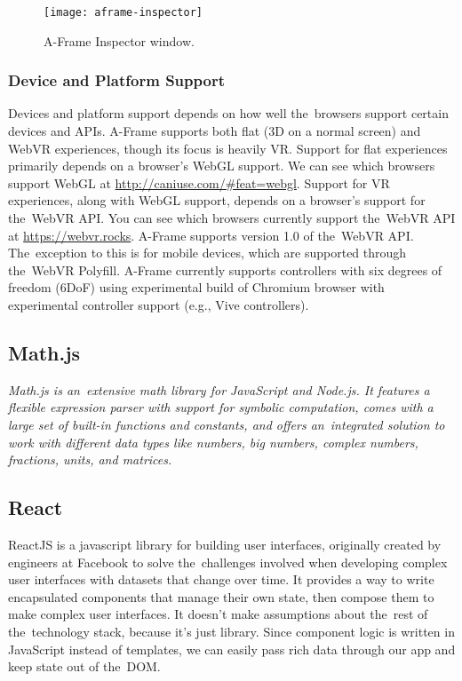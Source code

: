 \begin{figure}[ht!]
\centering
\texttt{[image: aframe-inspector]}
\caption{A-Frame Inspector window.}
\label{r:41}
\end{figure}

\subsubsection{Device and Platform Support}
Devices and platform support depends on how well the~browsers support certain devices and APIs. A-Frame supports both flat (3D on a normal screen) and WebVR experiences, though its focus is heavily VR. Support for flat experiences primarily depends on a browser’s WebGL support. We can see which browsers support WebGL at \url{http://caniuse.com/#feat=webgl}. Support for VR experiences, along with WebGL support, depends on a browser’s support for the~WebVR API. You can see which browsers currently support the~WebVR API at \url{https://webvr.rocks}. A-Frame supports version 1.0 of the~WebVR API. The~exception to this is for mobile devices, which are supported through the~WebVR Polyfill. A-Frame currently supports controllers with six degrees of freedom (6DoF) using experimental build of Chromium browser with experimental controller support (e.g., Vive controllers). \cite{aframe-intro}

\subsection{Math.js}
\textsl{Math.js is an~extensive math library for JavaScript and Node.js. It features a flexible expression parser with support for symbolic computation, comes with a large set of built-in functions and constants, and offers an~integrated solution to work with different data types like numbers, big numbers, complex numbers, fractions, units, and matrices.} \cite{mathjs}

\subsection{React}
ReactJS is a javascript library for building user interfaces, originally created by engineers at Facebook to solve the~challenges involved when developing complex user interfaces with datasets that change over time. It provides a way to write encapsulated components that manage their own state, then compose them to make complex user interfaces. It doesn't make assumptions about the~rest of the~technology stack, because it’s just library. Since component logic is written in JavaScript instead of templates, we can easily pass rich data through our app and keep state out of the~DOM. \cite{gackenheimer}

